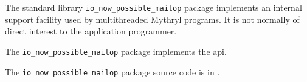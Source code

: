 
The standard library {\tt io\_now\_possible\_mailop} package implements an internal support facility used by multithreaded Mythryl programs.
It is not normally of direct interest to the application programmer.

The {\tt io\_now\_possible\_mailop} package implements the  api.

The {\tt io\_now\_possible\_mailop} package source code is in .
